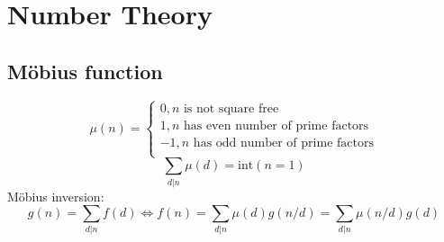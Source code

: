 \chapter{Number Theory}


\section{Möbius function}
$$\mu(n) = 
	\begin{cases}
		0, n \text{ is not square free}\\	
		1, n \text{ has even number of prime factors}\\
		-1, n \text{ has odd number of prime factors}\\
	\end{cases}
$$
$$\sum_{d | n} \mu(d) = \text{int}(n = 1)$$
Möbius inversion:
$$g(n) = \sum_{d | n} f(d) \iff f(n) = \sum_{d | n} \mu(d) g(n / d) = \sum_{d | n} \mu(n / d) g(d)$$
